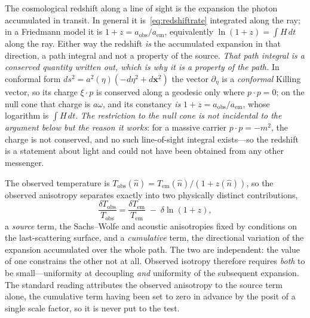 \documentclass[11pt,a4paper]{article}
\begin{document}
The cosmological redshift along a line of sight is the expansion the photon accumulated in transit. In general it is~\eqref{eq:redshiftrate} integrated along the ray; in a Friedmann model it is $1+z = a_{\mathrm{obs}}/a_{\mathrm{em}}$, equivalently $\ln(1+z) = \int H\,dt$ along the ray. Either way the redshift \emph{is} the accumulated expansion in that direction, a path integral and not a property of the source. \emph{That path integral is a conserved quantity written out, which is why it is a property of the path.} In conformal form $ds^{2}=a^{2}(\eta)(-d\eta^{2}+d\mathbf{x}^{2})$ the vector $\partial_\eta$ is a \emph{conformal} Killing vector, so its charge $\xi\!\cdot\!p$ is conserved along a geodesic only where $p\!\cdot\!p=0$; on the null cone that charge is $a\omega$, and its constancy \emph{is} $1+z=a_{\mathrm{obs}}/a_{\mathrm{em}}$, whose logarithm is $\int H\,dt$. \emph{The restriction to the null cone is not incidental to the argument below but the reason it works}: for a massive carrier $p\!\cdot\!p=-m^{2}$, the charge is not conserved, and no such line-of-sight integral exists---so the redshift is a statement about light and could not have been obtained from any other messenger.

The observed temperature is $T_{\mathrm{obs}}(\hat n) = T_{\mathrm{em}}(\hat n)/(1+z(\hat n))$, so the observed anisotropy separates exactly into two physically distinct contributions,
\begin{equation}
\frac{\delta T_{\mathrm{obs}}}{T_{\mathrm{obs}}} = \frac{\delta T_{\mathrm{em}}}{T_{\mathrm{em}}} \;-\; \delta\ln(1+z),
\label{eq:decomp}
\end{equation}
a \emph{source} term, the Sachs--Wolfe and acoustic anisotropies fixed by conditions on the last-scattering surface, and a \emph{cumulative} term, the directional variation of the expansion accumulated over the whole path. The two are independent: the value of one constrains the other not at all. Observed isotropy therefore requires \emph{both} to be small---uniformity at decoupling \emph{and} uniformity of the subsequent expansion. The standard reading attributes the observed anisotropy to the source term alone, the cumulative term having been set to zero in advance by the posit of a single scale factor, so it is never put to the test.
\end{document}
